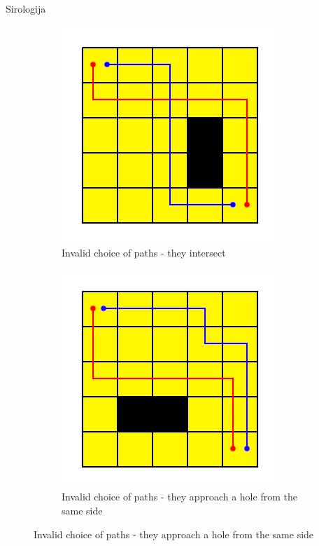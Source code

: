 \begin{statement}[
  problempoints=100,
  timelimit=1 second,
  memorylimit=1024 MiB,
]{Sirologija}
\begin{figure}[!h]
    \centering
    \begin{subfigure}{0.49\linewidth}
      \centering
      \includegraphics[width=\linewidth]{pic/sijeku_se.png}
      \caption{Invalid choice of paths - they intersect}

    \end{subfigure}
    \begin{subfigure}{0.49\linewidth}
      \centering
      \includegraphics[width=\linewidth]{pic/ista_strana.png}
      \caption{Invalid choice of paths - they approach a hole from the same side}


\end{subfigure}
\end{figure}
\end{statement}
